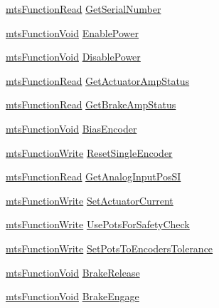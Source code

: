 \begin{DoxyCompactItemize}
\item 
\hyperlink{classmts_function_read}{mts\-Function\-Read} \hyperlink{structmts_intuitive_research_kit_arm_1_1_interface_robot_torque_a062752932e2f79bc77351351880bbf2b}{Get\-Serial\-Number}
\item 
\hyperlink{classmts_function_void}{mts\-Function\-Void} \hyperlink{structmts_intuitive_research_kit_arm_1_1_interface_robot_torque_a1cc2051ece69d30798eab88485a908af}{Enable\-Power}
\item 
\hyperlink{classmts_function_void}{mts\-Function\-Void} \hyperlink{structmts_intuitive_research_kit_arm_1_1_interface_robot_torque_a1075f510ccbb07968017a14010205b79}{Disable\-Power}
\item 
\hyperlink{classmts_function_read}{mts\-Function\-Read} \hyperlink{structmts_intuitive_research_kit_arm_1_1_interface_robot_torque_a0f08565aab45b8fa4acad986d2c32275}{Get\-Actuator\-Amp\-Status}
\item 
\hyperlink{classmts_function_read}{mts\-Function\-Read} \hyperlink{structmts_intuitive_research_kit_arm_1_1_interface_robot_torque_aa8c67aca50d320753b707fbe5a889ed3}{Get\-Brake\-Amp\-Status}
\item 
\hyperlink{classmts_function_void}{mts\-Function\-Void} \hyperlink{structmts_intuitive_research_kit_arm_1_1_interface_robot_torque_af0e16c8af9d23e035fd72f8da89ffd79}{Bias\-Encoder}
\item 
\hyperlink{classmts_function_write}{mts\-Function\-Write} \hyperlink{structmts_intuitive_research_kit_arm_1_1_interface_robot_torque_ae1012138a986fe735b1a062039e9c644}{Reset\-Single\-Encoder}
\item 
\hyperlink{classmts_function_read}{mts\-Function\-Read} \hyperlink{structmts_intuitive_research_kit_arm_1_1_interface_robot_torque_ac78a1e98bfa50cb04284238cdbaeae3b}{Get\-Analog\-Input\-Pos\-S\-I}
\item 
\hyperlink{classmts_function_write}{mts\-Function\-Write} \hyperlink{structmts_intuitive_research_kit_arm_1_1_interface_robot_torque_a67685d0499c298985fa6dff4c8c3a85b}{Set\-Actuator\-Current}
\item 
\hyperlink{classmts_function_write}{mts\-Function\-Write} \hyperlink{structmts_intuitive_research_kit_arm_1_1_interface_robot_torque_a33c894c1024853e9cbc7f496b2e05199}{Use\-Pots\-For\-Safety\-Check}
\item 
\hyperlink{classmts_function_write}{mts\-Function\-Write} \hyperlink{structmts_intuitive_research_kit_arm_1_1_interface_robot_torque_a53b75a3db7f1bbabb04430f347691e66}{Set\-Pots\-To\-Encoders\-Tolerance}
\item 
\hyperlink{classmts_function_void}{mts\-Function\-Void} \hyperlink{structmts_intuitive_research_kit_arm_1_1_interface_robot_torque_a81ef49a3d9bb641617bb6be6c7e56b78}{Brake\-Release}
\item 
\hyperlink{classmts_function_void}{mts\-Function\-Void} \hyperlink{structmts_intuitive_research_kit_arm_1_1_interface_robot_torque_a9977f2643a5e43b02d84f02d83cc0217}{Brake\-Engage}
\end{DoxyCompactItemize}


